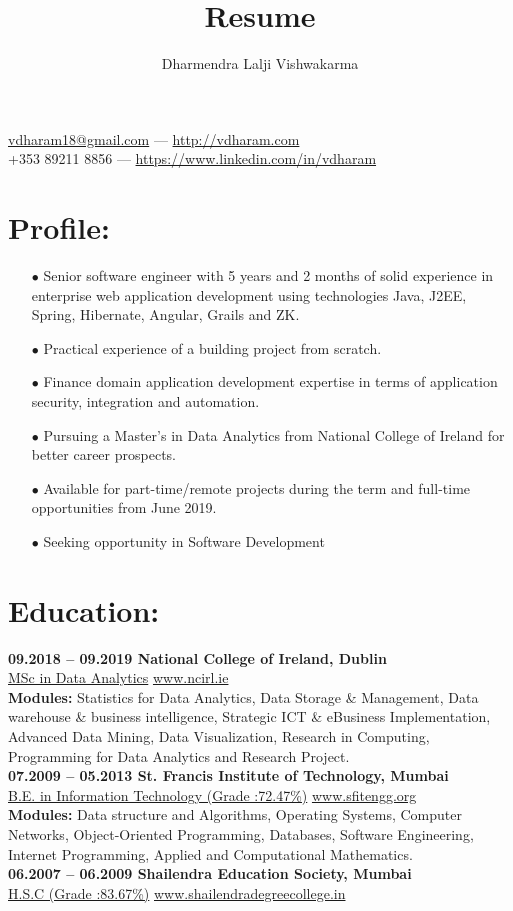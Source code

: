 \documentclass{article}
\makeatletter
\renewcommand{\maketitle}{
\begin{center}
{\LARGE\bfseries
\theauthor}

\vspace{0.25em}
\href{mailto:vdharam18@gmail.com}{vdharam18@gmail.com} --- \href{http://vdharam.com}{http://vdharam.com}
\vspace{0.25em}\\
+353 89211 8856 --- \href{https://www.linkedin.com/in/vdharam}{https://www.linkedin.com/in/vdharam}
\end{center}	
}
\makeatother
\begin{document}
\title{Resume}
\author{Dharmendra Lalji Vishwakarma}
\maketitle

\section{Profile:}
\begin{itemize}
\itemsep0em
\item[$\bullet$]
Senior software engineer with 5 years and 2 months of solid experience in enterprise web application development using technologies Java, J2EE, Spring, Hibernate, Angular, Grails and ZK.
\item[$\bullet$]
Practical experience of a building project from scratch.
\item[$\bullet$]
Finance domain application development expertise in terms of application security, integration and automation.
\item[$\bullet$]
Pursuing a Master's in Data Analytics from National College of Ireland for better career prospects.
\item[$\bullet$]
Available for part-time/remote projects during the term and full-time opportunities from June 2019.
\item[$\bullet$]
Seeking opportunity in Software Development
\end{itemize}
\section{Education:}
\textbf{09.2018 – 09.2019 \hfill National College of Ireland, Dublin\\}
\underline{MSc in Data Analytics} \hfill \href{www.ncirl.ie}{www.ncirl.ie}\\
\textbf{Modules:} Statistics for Data Analytics, Data Storage \& Management, Data warehouse \& business intelligence, Strategic ICT \& eBusiness Implementation, Advanced Data Mining, Data Visualization, Research in Computing, Programming for Data Analytics and Research Project.\hfill\\
\linebreak
\textbf{07.2009 – 05.2013 \hfill St. Francis Institute of Technology, Mumbai\\}
\underline{B.E. in Information Technology (Grade :72.47\%)} \hfill \href{www.sfitengg.org}{www.sfitengg.org} \\
\textbf{Modules:} Data structure and Algorithms, Operating Systems, Computer Networks, Object-Oriented Programming, Databases, Software Engineering, Internet Programming, Applied and Computational Mathematics.\hfill\\
\linebreak
\textbf{06.2007 – 06.2009 \hfill Shailendra Education Society, Mumbai \\}
\underline{H.S.C (Grade :83.67\%)} \hfill \href{www.shailendradegreecollege.in}{www.shailendradegreecollege.in}
\end{document}
